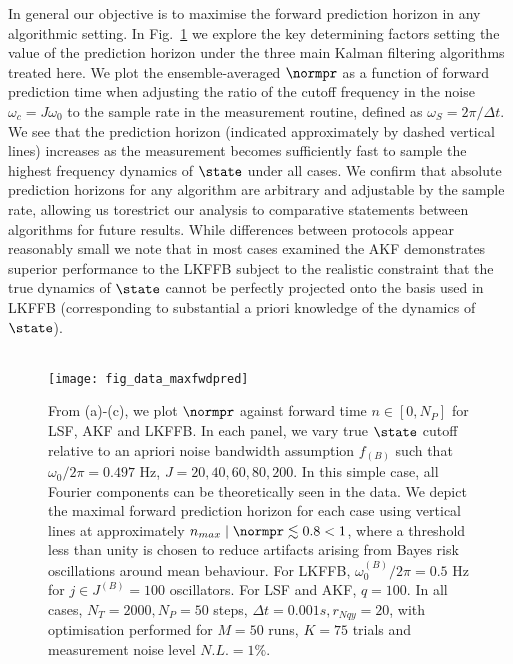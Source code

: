 {In general our objective is to maximise the forward prediction horizon in any algorithmic setting.  In Fig.~\ref{fig:main:fig_data_maxfwdpred} we explore the key determining factors setting the value of the prediction horizon under the three main Kalman filtering algorithms treated here.  We plot the ensemble-averaged $\normpr$ as a function of forward prediction time when adjusting the ratio of the cutoff frequency in the noise $\omega_{c}=J\omega_{0}$ to the sample rate in the measurement routine, defined as $\omega_{S}=2\pi/\Delta t$.  We see that the prediction horizon (indicated approximately by dashed vertical lines) increases as the measurement becomes sufficiently fast to sample the highest frequency dynamics of $\state$ under all cases.  We confirm that absolute prediction horizons for any algorithm are arbitrary and adjustable by the sample rate, allowing us torestrict our analysis to comparative statements between algorithms for future results.  While differences between protocols appear reasonably small we note that in most cases examined the AKF demonstrates superior performance to the LKFFB subject to the realistic constraint that the true dynamics of $\state$ cannot be perfectly projected onto the basis used in LKFFB (corresponding to substantial a priori knowledge of the dynamics of $\state$).
\\
\\
\begin{figure}
    \texttt{[image: fig\_data\_maxfwdpred]}
    \caption{\label{fig:main:fig_data_maxfwdpred} From (a)-(c), we plot $\normpr$ against forward time $n \in [0, N_P]$ for LSF, AKF and LKFFB. In each panel, we vary true $\state$ cutoff relative to an apriori noise bandwidth assumption $f_{(B)}$ such that $\omega_0 / 2\pi = 0.497$ Hz, $J = 20, 40, 60, 80, 200$. In this simple case, all Fourier components can be theoretically seen in the data. We depict the maximal forward prediction horizon for each case using vertical lines at approximately $ n_{max} \mid  \normpr \lesssim 0.8 < 1$, where a threshold less than unity is chosen to reduce artifacts arising from Bayes risk oscillations around mean behaviour. For LKFFB, $\omega_0^{(B)} / 2\pi = 0.5$ Hz for $j \in J^{(B)} = 100$ oscillators. For LSF and AKF, $q = 100$. In all cases,  $N_T = 2000, N_P = 50$ steps, $\Delta t = 0.001s, r_{Nqy}=20$, with optimisation performed for $M=50$ runs, $K=75$ trials and measurement noise level $N.L. = 1\%$. } 
\end{figure} 



}
